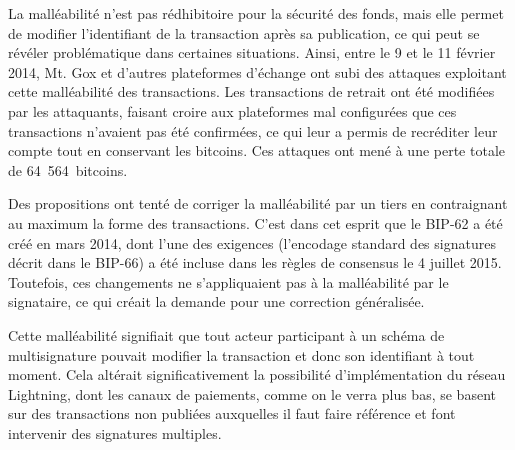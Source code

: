 La malléabilité n'est pas rédhibitoire pour la sécurité des fonds, mais elle permet de modifier l'identifiant de la transaction après sa publication, ce qui peut se révéler problématique dans certaines situations. Ainsi, entre le 9 et le 11 février 2014, Mt. Gox et d'autres plateformes d'échange ont subi des attaques exploitant cette malléabilité des transactions. Les transactions de retrait ont été modifiées par les attaquants, faisant croire aux plateformes mal configurées que ces transactions n'avaient pas été confirmées, ce qui leur a permis de recréditer leur compte tout en conservant les bitcoins. Ces attaques ont mené à une perte totale de 64~564~bitcoins.

Des propositions ont tenté de corriger la malléabilité par un tiers en contraignant au maximum la forme des transactions. C'est dans cet esprit que le BIP-62 a été créé en mars 2014, dont l'une des exigences (l'encodage standard des signatures décrit dans le BIP-66) a été incluse dans les règles de consensus le 4 juillet 2015. Toutefois, ces changements ne s'appliquaient pas à la malléabilité par le signataire, ce qui créait la demande pour une correction généralisée.

Cette malléabilité signifiait que tout acteur participant à un schéma de multisignature pouvait modifier la transaction et donc son identifiant à tout moment. Cela altérait significativement la possibilité d'implémentation du réseau Lightning, dont les canaux de paiements, comme on le verra plus bas, se basent sur des transactions non publiées auxquelles il faut faire référence et font intervenir des signatures multiples.

